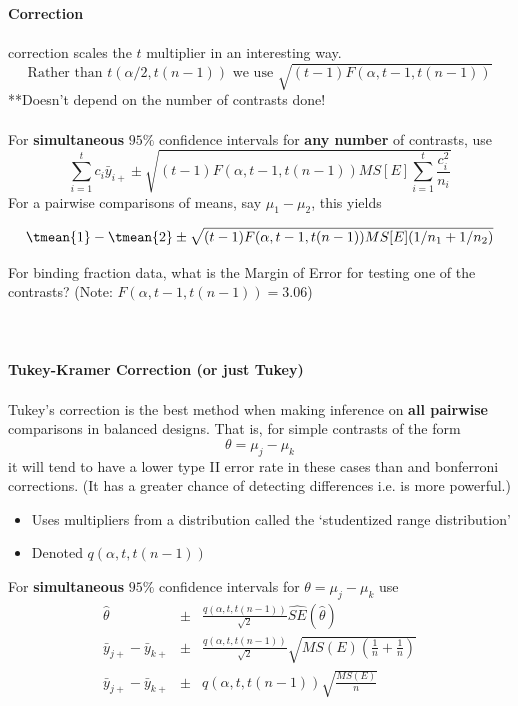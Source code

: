 \textbf{\chef Correction}\\~\\
\chef correction scales the $t$ multiplier in an interesting way.
$$\mbox{Rather than }t(\alpha/2,t(n-1)) \mbox{ we use }\sqrt{(t-1)F(\alpha,t-1,t(n-1))}$$
**Doesn't depend on the number of contrasts done!\\~\\
For {\bf simultaneous} $95\%$ confidence intervals for {\bf any number} of contrasts, use
$$ \sum_{i=1}^{t} c_i \bar{y}_{i+} \pm \sqrt{(t-1) F(\alpha,t-1,t(n-1)) MS[E] \sum_{i=1}^{t} \frac{c_i^2}{n_i}}$$
For a pairwise comparisons of means, say $\mu_1-\mu_2$, this yields
\begin{large}
$$ \tmean{1} - \tmean{2}\pm \sqrt{(t-1) F(\alpha,t-1,t(n-1)) MS[E] (1/n_1 + 1/n_2)}$$
\end{large}
For binding fraction data, what is the Margin of Error for testing one of the contrasts? (Note: $F(\alpha,t-1,t(n-1))=3.06$)\\
\\~\\~\\
\color{black}
\textbf{Tukey-Kramer Correction (or just Tukey)}\\~\\
Tukey's correction is the best method when making inference on \textbf{all pairwise} comparisons in balanced designs. That is, for simple contrasts of the form
$$ \theta=\mu_j-\mu_k$$
it will tend to have a lower type II error rate in these cases than \chef and bonferroni corrections.  (It has a greater chance of detecting differences i.e. is more powerful.)
\begin{itemize}
\item Uses multipliers from a distribution called the `studentized range distribution'
\item Denoted $q(\alpha,t,t(n-1))$
\end{itemize}
For {\bf simultaneous} $95\%$ confidence intervals for $\theta=\mu_j-\mu_k$ use
\begin{eqnarray*}
\hat{\theta}&\pm& \frac{q(\alpha,t,t(n-1))}{\sqrt{2}} \hat{SE}(\hat{\theta})\\
\bar{y}_{j+}-\bar{y}_{k+}&\pm& \frac{q(\alpha,t,t(n-1))}{\sqrt{2}}\sqrt{MS(E)(\frac{1}{n}+\frac{1}{n})}\\
\bar{y}_{j+}-\bar{y}_{k+}&\pm& q(\alpha,t,t(n-1))\sqrt{\frac{MS(E)}{n}}
\end{eqnarray*}
\newpage

